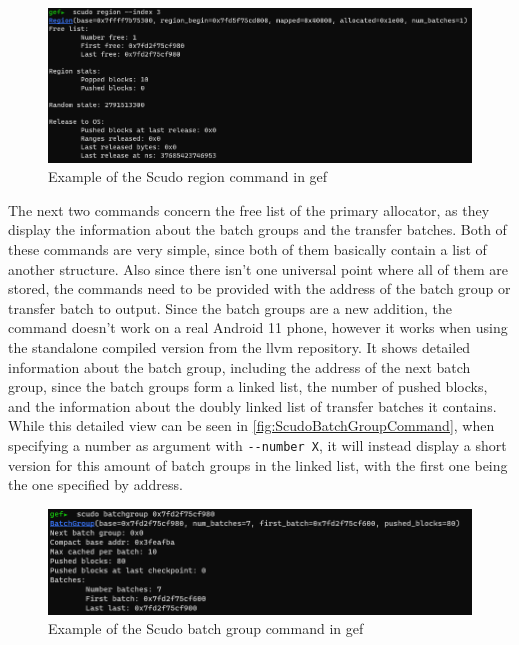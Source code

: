 \documentclass[a4paper,11pt,oneside]{report}
\begin{document}
\begin{figure}[h!]
  \centering
  \includegraphics[width=\linewidth]{figures/ScudoRegionCommand.png}
  \caption{Example of the Scudo region command in gef}
  \label{fig:ScudoRegionCommand}
\end{figure}

The next two commands concern the free list of the primary allocator, as they
display the information about the batch groups and the transfer batches. Both
of these commands are very simple, since both of them basically contain a list
of another structure. Also since there isn't one universal point where all of
them are stored, the commands need to be provided with the address of the
batch group or transfer batch to output.
Since the batch groups are a new addition, the command doesn't work on a real
Android 11 phone, however it works when using the standalone compiled version
from the llvm repository. It shows detailed information about the batch group,
including the address of the next batch group, since the batch groups form a
linked list, the number of pushed blocks, and the information about the doubly
linked list of transfer batches it contains. While this detailed view can be
seen in \autoref{fig:ScudoBatchGroupCommand}, when specifying a number as
argument with \verb|--number X|, it will instead display a short version for this
amount of batch groups in the linked list, with the first one being the one
specified by address.

\begin{figure}[h!]
  \centering
  \includegraphics[width=\linewidth]{figures/ScudoBatchGroupCommand.png}
  \caption{Example of the Scudo batch group command in gef}
  \label{fig:ScudoBatchGroupCommand}
\end{figure}
\end{document}
